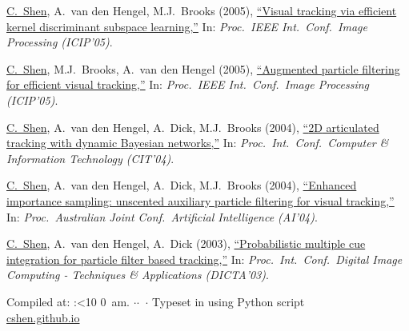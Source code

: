 \documentclass[9pt, a4paper]{article}
\newcommand{\years}[1]{\marginnote{\scriptsize #1}}
\def\highlight{\uline}
\newif\iftimePM
\def\now{\number\timehh:\ifnum\timemm<10 0\fi\number\timemm
         \iftimePM {$\,$pm.}  \else {$\,$am.}  \fi}
\edef\today{\number\day$\cdot$\number\month$\cdot$\number\year}
\begin{document}
\medskip

\years{2005} \highlight{C.~Shen}, A.~van den Hengel, M.J.~Brooks (2005),
\href{http://www.google.com/search?lr=&ie=UTF-8&oe=UTF-8&q=Visual+tracking+via+efficient+kernel+discriminant+subspace+learning+Chunhua+Shen%2C+Anton+van+den+Hengel%2C+Michael+J.+Brooks}{``Visual tracking via efficient kernel discriminant subspace learning,{}''}
In: \emph{Proc.\ IEEE Int.\ Conf.\  Image Processing (ICIP'05)}.

\medskip

\years{2005} \highlight{C.~Shen}, M.J.~Brooks, A.~van den Hengel (2005),
\href{http://www.google.com/search?lr=&ie=UTF-8&oe=UTF-8&q=Augmented+particle+filtering+for+efficient+visual+tracking+Chunhua+Shen%2C+Michael+J.+Brooks%2C+Anton+van+den+Hengel}{``Augmented particle filtering for efficient visual tracking,{}''}
In: \emph{Proc.\ IEEE Int.\ Conf.\  Image Processing (ICIP'05)}.

\medskip

\years{2004} \highlight{C.~Shen}, A.~van den Hengel, A.~Dick, M.J.~Brooks (2004),
\href{http://www.google.com/search?lr=&ie=UTF-8&oe=UTF-8&q=2D+articulated+tracking+with+dynamic+Bayesian+networks+Chunhua+Shen%2C+Anton+van+den+Hengel%2C+Anthony+Dick%2C+Michael+J.+Brooks}{``{2D} articulated tracking with dynamic {B}ayesian networks,{}''}
In: \emph{Proc.\ Int.\ Conf.\  Computer \& Information Technology (CIT'04)}.

\medskip

\years{2004} \highlight{C.~Shen}, A.~van den Hengel, A.~Dick, M.J.~Brooks (2004),
\href{http://www.google.com/search?lr=&ie=UTF-8&oe=UTF-8&q=Enhanced+importance+sampling%3A+unscented+auxiliary+particle+filtering+for+visual+tracking+Chunhua+Shen%2C+Anton+van+den+Hengel%2C+Anthony+Dick%2C+Michael+J.+Brooks}{``Enhanced importance sampling: unscented auxiliary particle filtering for visual tracking,{}''}
In: \emph{Proc.\ Australian Joint Conf.\  Artificial Intelligence (AI'04)}.

\medskip

\years{2003} \highlight{C.~Shen}, A.~van den Hengel, A.~Dick (2003),
\href{http://www.google.com/search?lr=&ie=UTF-8&oe=UTF-8&q=Probabilistic+multiple+cue+integration+for+particle+filter+based+tracking+Chunhua+Shen%2C+Anton+van+den+Hengel%2C+Anthony+Dick}{``Probabilistic multiple cue integration for particle filter based tracking,{}''}
In: \emph{Proc.\ Int.\ Conf.\  Digital Image Computing - Techniques \& Applications (DICTA'03)}.

\medskip

\vfill{}
\begin{center}
{\scriptsize Compiled at: \now \today\ $\cdot$ Typeset in {
\XeLaTeX{}
using Python script
}\\
\href{https://cshen.github.io}{cshen.github.io}
}
\end{center}
\end{document}
